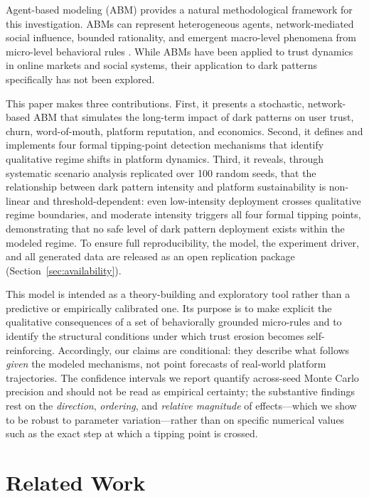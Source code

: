 \documentclass[a4paper]{article}
\begin{document}
Agent-based modeling (ABM) provides a natural methodological framework for this investigation. ABMs can represent heterogeneous agents, network-mediated social influence, bounded rationality, and emergent macro-level phenomena from micro-level behavioral rules \citep{mesa2024}. While ABMs have been applied to trust dynamics in online markets and social systems, their application to dark patterns specifically has not been explored.

This paper makes three contributions. First, it presents a stochastic, network-based ABM that simulates the long-term impact of dark patterns on user trust, churn, word-of-mouth, platform reputation, and economics. Second, it defines and implements four formal tipping-point detection mechanisms that identify qualitative regime shifts in platform dynamics. Third, it reveals, through systematic scenario analysis replicated over 100  random seeds, that the relationship between dark pattern intensity and platform sustainability is non-linear and threshold-dependent: even low-intensity deployment crosses qualitative regime boundaries, and moderate intensity triggers all four formal tipping points, demonstrating that no safe level of dark pattern deployment exists within the modeled regime. To ensure full reproducibility, the model, the experiment driver, and all generated data are released as an open replication package (Section~\ref{sec:availability}).

This model is intended as a theory-building and exploratory tool rather than a predictive or empirically calibrated one. Its purpose is to make explicit the qualitative consequences of a set of behaviorally grounded micro-rules and to identify the structural conditions under which trust erosion becomes self-reinforcing. Accordingly, our claims are conditional: they describe what follows \emph{given} the modeled mechanisms, not point forecasts of real-world platform trajectories. The confidence intervals we report quantify across-seed Monte Carlo precision and should not be read as empirical certainty; the substantive findings rest on the \emph{direction}, \emph{ordering}, and \emph{relative magnitude} of effects---which we show to be robust to parameter variation---rather than on specific numerical values such as the exact step at which a tipping point is crossed.

\section{Related Work}
\end{document}
